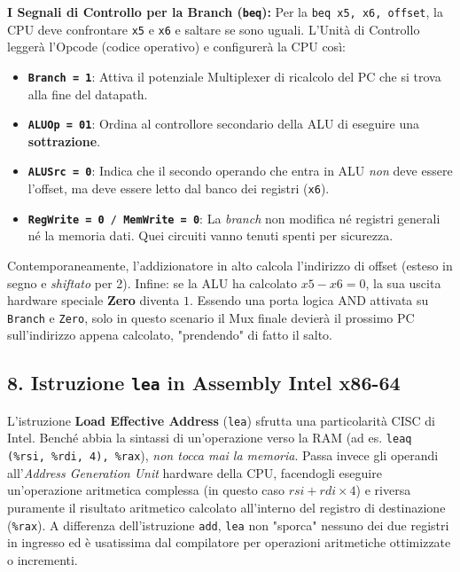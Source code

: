 \documentclass[12pt, a4paper]{article}
\begin{document}
\textbf{I Segnali di Controllo per la Branch (\texttt{beq}):}
Per la \texttt{beq x5, x6, offset}, la CPU deve confrontare \texttt{x5} e \texttt{x6} e saltare se sono uguali.
L'Unità di Controllo leggerà l'Opcode (codice operativo) e configurerà la CPU così:
\begin{itemize}
    \item \texttt{\textbf{Branch = 1}}: Attiva il potenziale Multiplexer di ricalcolo del PC che si trova alla fine del datapath.
    \item \texttt{\textbf{ALUOp = 01}}: Ordina al controllore secondario della ALU di eseguire una \textbf{sottrazione}.
    \item \texttt{\textbf{ALUSrc = 0}}: Indica che il secondo operando che entra in ALU \textit{non} deve essere l'offset, ma deve essere letto dal banco dei registri (\texttt{x6}).
    \item \texttt{\textbf{RegWrite = 0} / \textbf{MemWrite = 0}}: La \textit{branch} non modifica né registri generali né la memoria dati. Quei circuiti vanno tenuti spenti per sicurezza.
\end{itemize}
Contemporaneamente, l'addizionatore in alto calcola l'indirizzo di offset (esteso in segno e \textit{shiftato} per 2). 
Infine: se la ALU ha calcolato $x5 - x6 = 0$, la sua uscita hardware speciale \textbf{Zero} diventa $1$. Essendo una porta logica AND attivata su \texttt{Branch} e \texttt{Zero}, solo in questo scenario il Mux finale devierà il prossimo PC sull'indirizzo appena calcolato, "prendendo" di fatto il salto.



\subsection{8. Istruzione \texttt{lea} in Assembly Intel x86-64}
L'istruzione \textbf{Load Effective Address} (\texttt{lea}) sfrutta una particolarità CISC di Intel. Benché abbia la sintassi di un'operazione verso la RAM (ad es. \texttt{leaq (\%rsi, \%rdi, 4), \%rax}), \textit{non tocca mai la memoria}.
Passa invece gli operandi all'\textit{Address Generation Unit} hardware della CPU, facendogli eseguire un'operazione aritmetica complessa (in questo caso $rsi + rdi \times 4$) e riversa puramente il risultato aritmetico calcolato all'interno del registro di destinazione (\texttt{\%rax}). A differenza dell'istruzione \texttt{add}, \texttt{lea} non "sporca" nessuno dei due registri in ingresso ed è usatissima dal compilatore per operazioni aritmetiche ottimizzate o incrementi.
\end{document}
